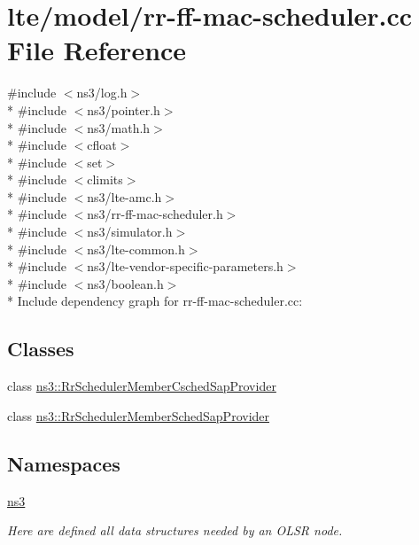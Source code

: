 \hypertarget{lte_2model_2rr-ff-mac-scheduler_8cc}{}\section{lte/model/rr-\/ff-\/mac-\/scheduler.cc File Reference}
\label{lte_2model_2rr-ff-mac-scheduler_8cc}
{\ttfamily \#include $<$ns3/log.\+h$>$}\\*
{\ttfamily \#include $<$ns3/pointer.\+h$>$}\\*
{\ttfamily \#include $<$ns3/math.\+h$>$}\\*
{\ttfamily \#include $<$cfloat$>$}\\*
{\ttfamily \#include $<$set$>$}\\*
{\ttfamily \#include $<$climits$>$}\\*
{\ttfamily \#include $<$ns3/lte-\/amc.\+h$>$}\\*
{\ttfamily \#include $<$ns3/rr-\/ff-\/mac-\/scheduler.\+h$>$}\\*
{\ttfamily \#include $<$ns3/simulator.\+h$>$}\\*
{\ttfamily \#include $<$ns3/lte-\/common.\+h$>$}\\*
{\ttfamily \#include $<$ns3/lte-\/vendor-\/specific-\/parameters.\+h$>$}\\*
{\ttfamily \#include $<$ns3/boolean.\+h$>$}\\*
Include dependency graph for rr-\/ff-\/mac-\/scheduler.cc\+:
\subsection*{Classes}
\begin{DoxyCompactItemize}
\item 
class \hyperlink{classns3_1_1RrSchedulerMemberCschedSapProvider}{ns3\+::\+Rr\+Scheduler\+Member\+Csched\+Sap\+Provider}
\item 
class \hyperlink{classns3_1_1RrSchedulerMemberSchedSapProvider}{ns3\+::\+Rr\+Scheduler\+Member\+Sched\+Sap\+Provider}
\end{DoxyCompactItemize}
\subsection*{Namespaces}
\begin{DoxyCompactItemize}
\item 
 \hyperlink{namespacens3}{ns3}
\begin{DoxyCompactList}\small\item\em Here are defined all data structures needed by an O\+L\+SR node. \end{DoxyCompactList}\end{DoxyCompactItemize}
